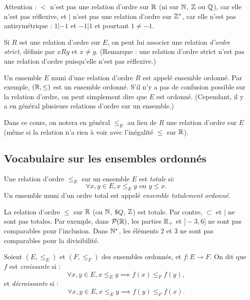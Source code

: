 Attention : $<$ n'est pas une relation d'ordre sur $\mathbb{R}$ (ni sur $\mathbb{N}$, $\mathbb{Z}$ ou $\mathbb{Q}$), car elle n'est pas réflexive, et $|$ n'est pas une relation d'ordre sur $\mathbb{Z}^*$, car elle n'est pas antisymétrique : $1|-1$ et $-1|1$ et pourtant $1\neq -1$.

\begin{definition}
Si $R$ est une relation d'ordre sur $E$, on peut lui associer une relation \emph{d'ordre strict}, définie par \og$ xRy\text{ et }x\neq y$\fg. (Remarque : une relation d'ordre strict n'est pas une relation d'ordre puisqu'elle n'est pas réflexive.)
\end{definition}

Un ensemble $E$ muni d'une relation d'ordre $R$ est appelé ensemble ordonné. Par exemple, $(\mathbb{R}, \leq)$ est un ensemble ordonné. S'il n'y a pas de confusion possible sur la relation d'ordre, on peut simplement dire que $E$ est ordonné. (Cependant, il y a en général plusieurs relations d'ordre sur un ensemble.)

Dans ce cours, on notera en général $\leq_E$ au lieu de $R$ une relation d'ordre sur $E$ (même si la relation n'a rien à voir avec l'inégalité $\leq$ sur $\mathbb{R}$).


\subsection{Vocabulaire sur les ensembles ordonnés}

\begin{definition}
Une relation d'ordre $\leq_E$ sur un ensemble $E$ est \emph{totale} si:
\[ \forall x, y\in E, x\leq_Ey\text{ ou } y\leq x.\]
Un ensemble muni d'un ordre total est appelé \emph{ensemble totalement ordonné}.
\end{definition}

\begin{exemples}
La relation d'ordre $\leq$ sur $\mathbb{R}$ (ou $\mathbb{N}$, $\$Q$, $\mathbb{Z}$) est totale. Par contre, $\subset$ et $|$ ne sont pas totales. Par exemple, dans $\mathcal P(\mathbb{R})$, les parties $\mathbb{R}_+$ et $]-3,6]$ ne sont pas comparables pour l'inclusion. Dans $\mathbb{N}^*$, les éléments $2$ et $3$ ne sont pas comparables pour la divisibilité.
\end{exemples}

\begin{definition}
Soient $(E,\leq_E)$ et $(F,\leq_F)$ des ensembles ordonnés, et $f : E\to F$. On dit que $f$ est \emph{croissante} si :
\[ \forall x, y\in E, x\leq_E y \implies f(x) \leq_F f(y),\]
et \emph{décroissante} si :
\[\forall x, y\in E, x\leq_E y \implies f(y) \leq_F f(x).\]
\end{definition}

